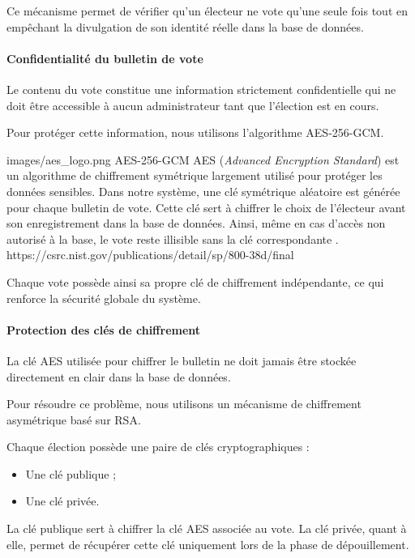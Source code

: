 ﻿\documentclass[12pt,a4paper]{report}
\begin{document}
Ce mécanisme permet de vérifier qu’un électeur ne vote qu’une seule fois tout
en empêchant la divulgation de son identité réelle dans la base de données.

\paragraph{Confidentialité du bulletin de vote}\mbox{}

Le contenu du vote constitue une information strictement confidentielle qui ne
doit être accessible à aucun administrateur tant que l’élection est en cours.

Pour protéger cette information, nous utilisons l’algorithme AES-256-GCM.

\techno
{images/aes_logo.png}
{AES-256-GCM}
{AES (\textit{Advanced Encryption Standard}) est un algorithme de chiffrement
symétrique largement utilisé pour protéger les données sensibles. Dans notre
système, une clé symétrique aléatoire est générée pour chaque bulletin de vote.
Cette clé sert à chiffrer le choix de l’électeur avant son enregistrement dans
la base de données. Ainsi, même en cas d’accès non autorisé à la base, le vote
reste illisible sans la clé correspondante \cite{nistAesGcm}.}
{https://csrc.nist.gov/publications/detail/sp/800-38d/final}

Chaque vote possède ainsi sa propre clé de chiffrement indépendante, ce qui
renforce la sécurité globale du système.

\paragraph{Protection des clés de chiffrement}\mbox{}

La clé AES utilisée pour chiffrer le bulletin ne doit jamais être stockée
directement en clair dans la base de données.

Pour résoudre ce problème, nous utilisons un mécanisme de chiffrement
asymétrique basé sur RSA.

Chaque élection possède une paire de clés cryptographiques :

\begin{itemize}
\item Une clé publique ;
\item Une clé privée.
\end{itemize}

La clé publique sert à chiffrer la clé AES associée au vote. La clé privée,
quant à elle, permet de récupérer cette clé uniquement lors de la phase de
dépouillement.
\end{document}
